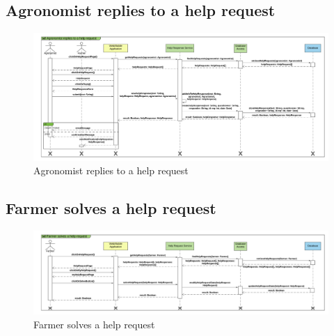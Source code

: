 \subsection{Agronomist replies to a help request}

\newpage
\begin{landscape}
\begin{figure}[h]
\vspace*{-2cm}
\noindent
\centering
\centerline{\includegraphics[scale= 0.108]{./Images/Sequence diagram/Agronomist replies to a help request.png}}
    \caption{Agronomist replies to a help request}
    \vspace*{-12cm}
\end{figure}
\fillandplacepagenumber
\end{landscape}

\subsection{Farmer solves a help request}

\newpage
\begin{landscape}
\begin{figure}[h]
\vspace*{-2cm}
\noindent
\centering
\centerline{\includegraphics[scale= 0.108]{./Images/Sequence diagram/Farmer solves a help request.png}}
    \caption {Farmer solves a help request}
    \vspace*{-12cm}
\end{figure}
\fillandplacepagenumber
\end{landscape}


